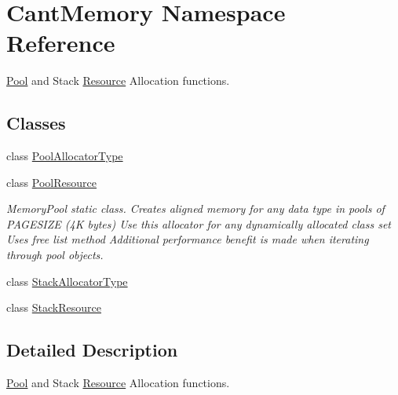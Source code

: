 \hypertarget{namespaceCantMemory}{}\section{Cant\+Memory Namespace Reference}
\label{namespaceCantMemory}


\hyperlink{structPool}{Pool} and Stack \hyperlink{structResource}{Resource} Allocation functions.  


\subsection*{Classes}
\begin{DoxyCompactItemize}
\item 
class \hyperlink{classCantMemory_1_1PoolAllocatorType}{Pool\+Allocator\+Type}
\item 
class \hyperlink{classCantMemory_1_1PoolResource}{Pool\+Resource}
\begin{DoxyCompactList}\small\item\em Memory\+Pool static class. Creates aligned memory for any data type in pools of P\+A\+G\+E\+S\+I\+ZE (4K bytes) Use this allocator for any dynamically allocated class set Uses free list method Additional performance benefit is made when iterating through pool objects. \end{DoxyCompactList}\item 
class \hyperlink{classCantMemory_1_1StackAllocatorType}{Stack\+Allocator\+Type}
\item 
class \hyperlink{classCantMemory_1_1StackResource}{Stack\+Resource}
\end{DoxyCompactItemize}


\subsection{Detailed Description}
\hyperlink{structPool}{Pool} and Stack \hyperlink{structResource}{Resource} Allocation functions. 